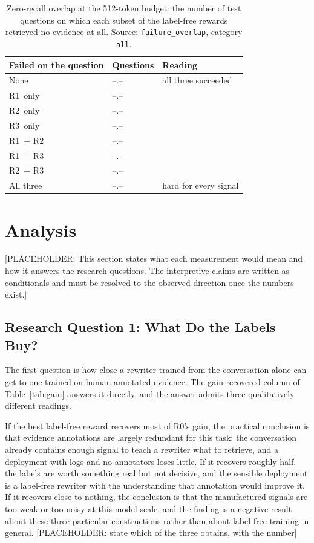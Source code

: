 \documentclass[12pt,letterpaper,oneside]{report}
\newcommand{\phnum}{\textcolor{phtext}{\textsf{\footnotesize --.--}}}
\newcommand{\ph}[1]{\textcolor{phtext}{[\textsf{\footnotesize PLACEHOLDER: #1}]}}
\newcommand{\code}[1]{\texttt{\small #1}}
\newcommand{\Rz}{R0}
\newcommand{\Ra}{R1}
\newcommand{\Rb}{R2}
\newcommand{\Rc}{R3}
\newenvironment{tab}{\begingroup\singlespacing\small}{\endgroup}
\begin{document}
\begin{table}[htbp]
\caption[Zero-recall overlap at the 512-token budget]{Zero-recall overlap at the 512-token budget: the number of test
questions on which each subset of the label-free rewards retrieved no evidence
at all. Source: \code{failure\_overlap}, category \code{all}.}
\label{tab:overlap}
\centering
\begin{tab}
\begin{tabular}{@{}L{1.9in}R{1.0in}L{1.5in}@{}}
\toprule
\textbf{Failed on the question} & \textbf{Questions} &
\textbf{Reading} \\
\midrule
None                 & \phnum & all three succeeded \\
\Ra\ only            & \phnum & \\
\Rb\ only            & \phnum & \\
\Rc\ only            & \phnum & \\
\Ra\ + \Rb           & \phnum & \\
\Ra\ + \Rc           & \phnum & \\
\Rb\ + \Rc           & \phnum & \\
All three            & \phnum & hard for every signal \\
\bottomrule
\end{tabular}
\end{tab}
\end{table}

\section{Analysis}
\label{sec:analysis}

\ph{This section states what each measurement would mean and how it answers
the research questions. The interpretive claims are written as conditionals
and must be resolved to the observed direction once the numbers exist.}

\subsection{Research Question 1: What Do the Labels Buy?}

The first question is how close a rewriter trained from the conversation alone
can get to one trained on human-annotated evidence. The gain-recovered column
of Table~\ref{tab:gain} answers it directly, and the answer admits three
qualitatively different readings.

If the best label-free reward recovers most of \Rz's gain, the practical
conclusion is that evidence annotations are largely redundant for this task:
the conversation already contains enough signal to teach a rewriter what to
retrieve, and a deployment with logs and no annotators loses little. If it
recovers roughly half, the labels are worth something real but not decisive,
and the sensible deployment is a label-free rewriter with the understanding
that annotation would improve it. If it recovers close to nothing, the
conclusion is that the manufactured signals are too weak or too noisy at this
model scale, and the finding is a negative result about these three particular
constructions rather than about label-free training in general.
\ph{state which of the three obtains, with the number}
\end{document}
